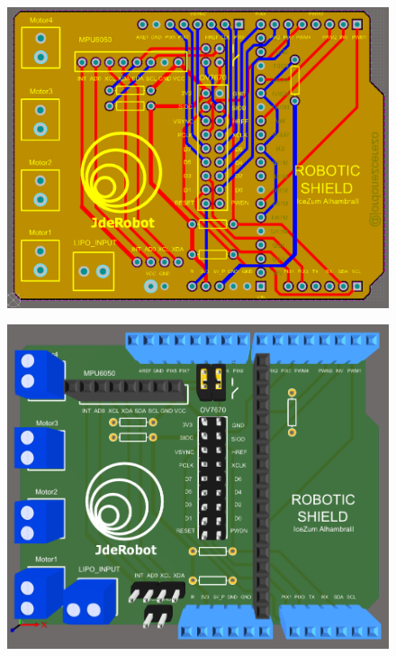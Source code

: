 \begin{center}
	\begin{figure}[H]
		\center
		\includegraphics[scale=0.8, angle=90]{imagenes/Balancing_Robot/layers_altium.PNG}
		\caption{}
		\label{fig:layers_altium}
	\end{figure}
\end{center}

\begin{center}
	\begin{figure}[H]
		\center
		\includegraphics[scale=0.6]{imagenes/Balancing_Robot/top_3D.PNG}
		\caption{}
		\label{fig:top_3D}
	\end{figure}
\end{center}

